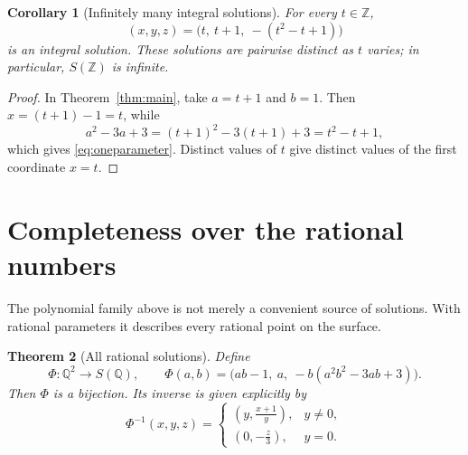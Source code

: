 \documentclass[11pt]{article}
\newtheorem{theorem}{Theorem}
\newtheorem{corollary}[theorem]{Corollary}
\theoremstyle{remark}
\newcommand{\Z}{\mathbb{Z}}
\newcommand{\Q}{\mathbb{Q}}
\begin{document}
\begin{corollary}[Infinitely many integral solutions]\label{cor:infinite}
For every $t\in\Z$,
\begin{equation}\label{eq:oneparameter}
 \boxed{(x,y,z)=\bigl(t,\ t+1,\ -(t^2-t+1)\bigr)}
\end{equation}
is an integral solution.  These solutions are pairwise distinct as
$t$ varies; in particular, $S(\Z)$ is infinite.
\end{corollary}

\begin{proof}
In Theorem~\ref{thm:main}, take $a=t+1$ and $b=1$.  Then
$x=(t+1)-1=t$, while
\[
 a^2-3a+3=(t+1)^2-3(t+1)+3=t^2-t+1,
\]
which gives \eqref{eq:oneparameter}.  Distinct values of $t$ give
distinct values of the first coordinate $x=t$.
\end{proof}

\section{Completeness over the rational numbers}

The polynomial family above is not merely a convenient source of
solutions.  With rational parameters it describes every rational
point on the surface.

\begin{theorem}[All rational solutions]\label{thm:rational}
Define
\[
 \Phi:\Q^2\longrightarrow S(\Q),\qquad
 \Phi(a,b)=
 \bigl(ab-1,\ a,\ -b(a^2b^2-3ab+3)\bigr).
\]
Then $\Phi$ is a bijection.  Its inverse is given explicitly by
\begin{equation}\label{eq:inverse}
 \Phi^{-1}(x,y,z)=
 \begin{cases}
 \displaystyle\left(y,\frac{x+1}{y}\right),&y\ne0,\\[3mm]
 \displaystyle\left(0,-\frac{z}{3}\right),&y=0.
 \end{cases}
\end{equation}
\end{theorem}
\end{document}
